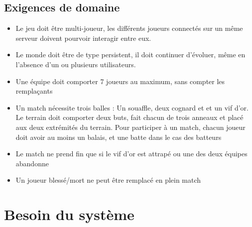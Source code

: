 \documentclass[a4paper]{article}
\begin{document}
\subsection{Exigences de domaine}
\begin{itemize}
\item Le jeu doit être multi-joueur, les différents joueurs connectés sur un même serveur doivent pourvoir interagir entre eux.
\item Le monde doit être de type persistent, il doit continuer d'évoluer, même en l'absence d'un ou plusieurs utilisateurs.
\item Une équipe doit comporter 7 joueurs au maximum, sans compter les remplaçants %
\item Un match nécessite trois balles : Un souaffle, deux cognard et  et un vif d'or. Le terrain doit comporter deux buts, fait chacun de trois anneaux et placé aux deux extrémités du terrain. Pour participer à un match, chacun joueur doit avoir au moins un balais, et une batte dans le cas des batteurs %
\item Le match ne prend fin que si le vif d'or est attrapé ou une des deux équipes abandonne
\item Un joueur blessé/mort ne peut être remplacé en plein match 
\end{itemize}


\section{Besoin du système}
\end{document}
